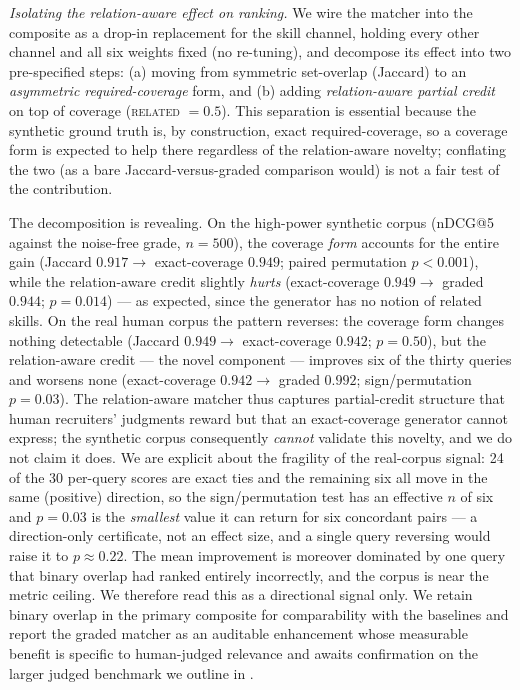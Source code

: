 \emph{Isolating the relation-aware effect on ranking.} We wire the matcher into the composite as a drop-in
replacement for the skill channel, holding every other channel and all six weights fixed (no re-tuning),
and decompose its effect into two pre-specified steps: (a) moving from symmetric set-overlap (Jaccard) to
an \emph{asymmetric required-coverage} form, and (b) adding \emph{relation-aware partial credit} on top of
coverage (\textsc{related} $=0.5$). This separation is essential because the synthetic ground truth is, by
construction, exact required-coverage, so a coverage form is expected to help there regardless of the
relation-aware novelty; conflating the two (as a bare Jaccard-versus-graded comparison would) is not a fair
test of the contribution.

The decomposition is revealing. On the high-power synthetic corpus (nDCG@5 against the noise-free grade,
$n = 500$), the coverage \emph{form} accounts for the entire gain (Jaccard $0.917 \rightarrow$
exact-coverage $0.949$; paired permutation $p < 0.001$), while the relation-aware credit slightly
\emph{hurts} (exact-coverage $0.949 \rightarrow$ graded $0.944$; $p = 0.014$) --- as expected, since the
generator has no notion of related skills. On the real human corpus the pattern reverses: the coverage form
changes nothing detectable (Jaccard $0.949 \rightarrow$ exact-coverage $0.942$; $p = 0.50$), but the
relation-aware credit --- the novel component --- improves six of the thirty queries and worsens none
(exact-coverage $0.942 \rightarrow$ graded $0.992$; sign/permutation $p = 0.03$). The relation-aware matcher
thus captures partial-credit structure that human recruiters' judgments reward but that an exact-coverage
generator cannot express; the synthetic corpus consequently \emph{cannot} validate this novelty, and we do
not claim it does. We are explicit about the fragility of the real-corpus signal: 24 of the 30 per-query
scores are exact ties and the remaining six all move in the same (positive) direction, so the sign/permutation
test has an effective $n$ of six and $p = 0.03$ is the \emph{smallest} value it can return for six concordant
pairs --- a direction-only certificate, not an effect size, and a single query reversing would raise it to
$p \approx 0.22$. The mean improvement is moreover dominated by one query that binary overlap had ranked
entirely incorrectly, and the corpus is near the metric ceiling. We therefore read this as a directional
signal only. We retain binary overlap in the primary composite for comparability with the baselines and
report the graded matcher as an auditable enhancement whose measurable benefit is specific to human-judged
relevance and awaits confirmation on the larger judged benchmark we outline in .

